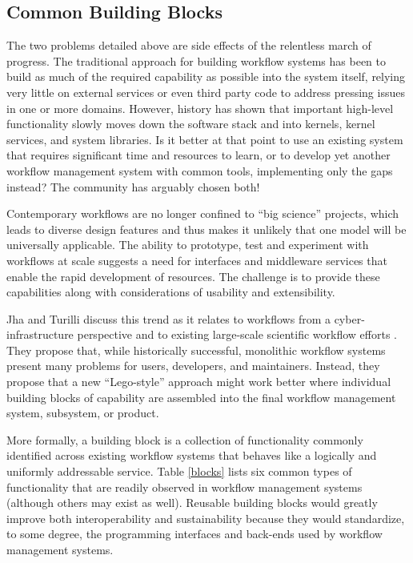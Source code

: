 \subsection{Common Building Blocks}\label{buildings-blocks}

The two problems detailed above are side effects of the relentless march of
progress. The traditional approach for building workflow systems has been to
build as much of the required capability as possible into the system itself,
relying very little on external services or even third party code to address
pressing issues in one or more domains. However, history has shown that
important high-level functionality slowly moves down the software stack and
into kernels, kernel services, and system libraries. Is it better at that
point to use an existing system that requires significant time and resources
to learn, or to develop yet another workflow management system with common
tools, implementing only the gaps instead? The community has arguably chosen
both!

Contemporary workflows are no longer confined to ``big science'' projects,
which leads to diverse design features and thus makes it unlikely that one
model will be universally applicable. The ability to prototype, test and
experiment with workflows at scale suggests a need for interfaces and
middleware services that enable the rapid development of resources. The
challenge is to provide these capabilities along with considerations of
usability and extensibility.

Jha and Turilli discuss this trend as it relates to workflows from a 
cyber-infrastructure perspective and to existing large-scale scientific
workflow efforts \cite{jha_building_2016}. They propose that, while
historically successful, monolithic workflow systems present many problems for
users, developers, and maintainers. Instead, they propose that a new
``Lego-style'' approach might work better where individual building blocks of
capability are assembled into the final workflow management system, subsystem,
or product.

More formally, a building block is a collection of functionality commonly
identified across existing workflow systems that behaves like a logically and
uniformly addressable service. Table \ref{blocks} lists six common types of
functionality that are readily observed in workflow management systems
(although others may exist as well). Reusable building blocks would greatly
improve both interoperability and sustainability because they would
standardize, to some degree, the programming interfaces and back-ends used by
workflow management systems.

